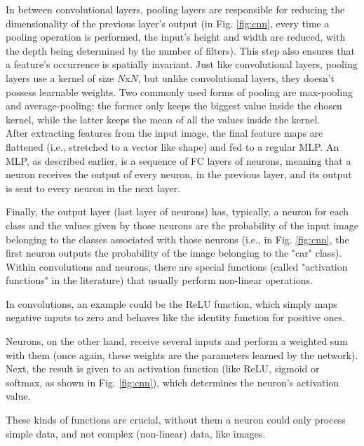 In between convolutional layers, pooling layers are responsible for reducing the dimensionality of the previous layer's output (in Fig. \ref{fig:cnn}, every time a pooling operation is performed, the input's height and width are reduced, with the depth being determined by the number of filters). This step also ensures that a feature's occurrence is spatially invariant. Just like convolutional layers, pooling layers use a kernel of size $N$x$N$, but unlike convolutional layers, they doesn't possess learnable weights. Two commonly used forms of pooling are max-pooling and average-pooling: the former only keeps the biggest value inside the chosen kernel, while the latter keeps the mean of all the values inside the kernel.\\
    
After extracting features from the input image, the final feature maps are flattened (i.e., stretched to a vector like shape) and fed to a regular \ac{MLP}. An \ac{MLP}, as described earlier, is a sequence of \ac{FC} layers of neurons, meaning that a neuron receives the output of every neuron, in the previous layer, and its output is sent to every neuron in the next layer.
    
Finally, the output layer (last layer of neurons) has, typically, a neuron for each class and the values given by those neurons are the probability of the input image belonging to the classes associated with those neurons (i.e., in Fig. \ref{fig:cnn}, the first neuron outputs the probability of the image belonging to the "car" class).\\

Within convolutions and neurons, there are special functions (called "activation functions" in the literature) that usually perform non-linear operations. 

In convolutions, an example could be the \ac{ReLU} function, which simply maps negative inputs to zero and behaves like the identity function for positive ones. 
    
Neurons, on the other hand, receive several inputs and perform a weighted sum with them (once again, these weights are the parameters learned by the network). Next, the result is given to an activation function (like \ac{ReLU}, sigmoid or softmax, as shown in Fig. \ref{fig:cnn}), which determines the neuron's activation value.

These kinds of functions are crucial, without them a neuron could only process simple data, and not complex (non-linear) data, like images.\\

